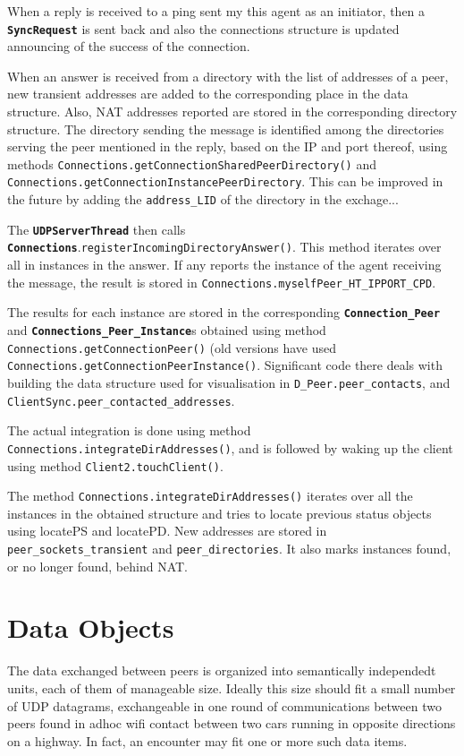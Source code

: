 \documentclass{book}
\newcommand{\cls}[1]{{\tt\bf #1}}
\newcommand{\mth}[1]{{\tt #1}}
\newcommand{\mmb}[1]{{\tt #1}}
\begin{document}
When a reply is received to a ping sent my this agent as an initiator, then a \cls{SyncRequest} is sent back and 
also the connections structure is updated announcing of the success of the connection.

When an answer is received from a directory with the list of addresses of a peer, new transient addresses are added to the
corresponding place in the data structure. Also, NAT addresses reported are stored in the corresponding directory structure.
The directory sending the message is identified among the directories serving the peer mentioned in the reply, based on the
IP and port thereof, using methods \mth{Connections.getConnectionSharedPeerDirectory()} and \mth{Connections.getConnectionInstancePeerDirectory}. This can be improved in the future by adding the \mmb{address\_LID} of the directory in the exchage...

The \cls{UDPServerThread} then calls \cls{Connections}.\mth{registerIncomingDirectoryAnswer()}.
This method iterates over all in instances in the answer. If any reports the instance of the agent receiving the message,
the result is stored in \mth{Connections.myselfPeer\_HT\_IPPORT\_CPD}.

The results for each instance are stored in the corresponding \cls{Connection\_Peer} and \cls{Connections\_Peer\_Instance}s
obtained using method \mth{Connections.getConnectionPeer()} (old versions have used \mth{Connections.getConnectionPeerInstance()}. 
Significant code there deals with building the data structure used for visualisation in \mmb{D\_Peer.peer\_contacts},
and \mmb{ClientSync.peer\_contacted\_addresses}.

The actual integration is done using method \mth{Connections.integrateDirAddresses()}, and is followed by waking up
the client using method \mth{Client2.touchClient()}.

The method \mth{Connections.integrateDirAddresses()} iterates over all the instances in the obtained structure and
tries to locate previous status objects using locatePS and locatePD. New addresses are stored in \mmb{peer\_sockets\_transient}
and \mmb{peer\_directories}. It also marks instances found, or no longer found, behind NAT.

\chapter{Data Objects}
The data exchanged between peers is organized into semantically independedt units, each of them of manageable size.
Ideally this size should fit a small number of UDP datagrams, exchangeable in one round of communications between two peers found in
adhoc wifi contact between two cars running in opposite directions on a highway. In fact, an encounter may fit one or more such data items.
\end{document}
